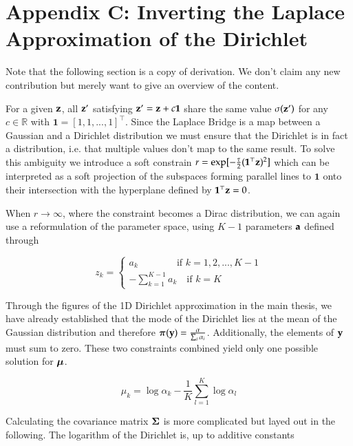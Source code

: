 \section*{Appendix C: Inverting the Laplace Approximation of the Dirichlet}
\label{sec:InversionLADirichlet}

Note that the following section is a copy of \cite{Hennig2010} derivation. We don't claim any new contribution but merely want to give an overview of the content. 

For a given ${\mathbf{z}}$, all ${\mathbf{z}}'$ satisfying ${\mathbf{z}}' = {\mathbf{z}} + c \mathbf{1}$ share the same value $\sigma({\mathbf{z}}')$ for any $c \in \mathbb{R}$ with $\mathbf{1} = [1,1, ..., 1]^\top$. Since the Laplace Bridge is a map between a Gaussian and a Dirichlet distribution we must ensure that the Dirichlet is in fact a distribution, i.e. that multiple values don't map to the same result. To solve this ambiguity we introduce a soft constrain $r = \exp[-\frac{\tau}{2}(\mathbf{1}^\top {\mathbf{z}})^2]$ which can be interpreted as a soft projection of the subspaces forming parallel lines to $\mathbf{1}$ onto their intersection with the hyperplane defined by $\mathbf{1}^\top {\mathbf{z}} = 0$. 

When $r \rightarrow \infty$, where the constraint becomes a Dirac distribution, we can again use a reformulation of the parameter space, using $K-1$ parameters ${\mathbf{a}}$ defined through

\begin{equation}
	z_k = \begin{cases}
		a_k \qquad \qquad \text{if } k = 1,2, ..., K-1 \\
		- \sum_{k=1}^{K-1} a_k \quad \text{if } k = K
	\end{cases}
\end{equation}

Through the figures of the 1D Dirichlet approximation in the main thesis, we have already established that the mode of the Dirichlet lies at the mean of the Gaussian distribution and therefore $\boldsymbol{\pi}(\mathbf{y}) = \frac{\mathbf{\alpha}}{\sum_i \alpha_i}$. Additionally, the elements of $\mathbf{y}$ must sum to zero. These two constraints combined yield only one possible solution for ${\boldsymbol{\mu}}$.

\begin{equation}
	\mu_k = \log \alpha_k  - \frac{1}{K} \sum_{l=1}^{K} \log \alpha_l
	\label{eq:mu_k}
\end{equation}

Calculating the covariance matrix ${\boldsymbol{\Sigma}}$ is more complicated but layed out in the following. The logarithm of the Dirichlet is, up to additive constants

